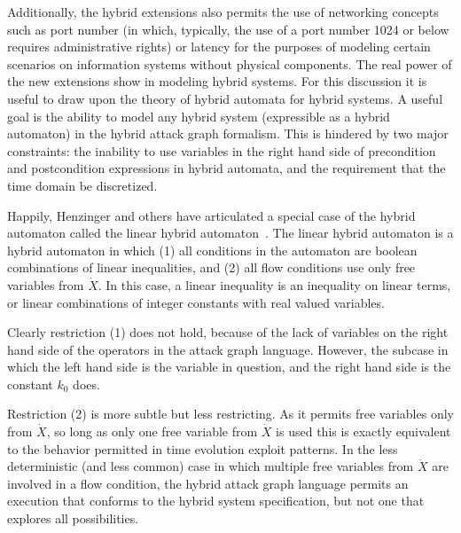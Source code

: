 Additionally, the hybrid extensions also permits the use of
networking concepts such as port number (in which, typically, the use of a
port number 1024 or below requires administrative rights) or latency for the
purposes of modeling certain scenarios on information systems without physical
components.
The real power of the new extensions show in modeling hybrid systems. For
this discussion it is useful to draw upon the theory of hybrid automata for
hybrid systems. A useful goal is the ability to model any hybrid system
(expressible as a hybrid automaton) in the hybrid attack graph formalism. This
is hindered by two major constraints: the inability to use variables
in the right hand side of precondition and postcondition expressions in
hybrid automata, and the requirement that the time domain be discretized.

\label{sec:hag_ha}
Happily, Henzinger and others have articulated a special case of the
hybrid automaton called the linear hybrid automaton~\cite{henzinger1996theory}.
The linear hybrid automaton is a hybrid automaton in which (1) all conditions
in the automaton are boolean combinations of linear inequalities, and (2) all
flow conditions use only free variables from $\dot{X}$. In this case, a linear
inequality is an inequality on linear terms, or linear combinations of
integer constants with real valued variables.

Clearly restriction (1) does not hold, because of the lack of variables
on the right hand side of the operators in the attack graph language. However,
the subcase in which the left hand side is the variable in question, and the
right hand side is the constant $k_0$ does.

Restriction (2) is more subtle but less restricting. As it permits free
variables only from $\dot{X}$, so long as only one free variable from $\dot{X}$ is
used this is exactly equivalent to the behavior permitted in time evolution
exploit patterns. In the less deterministic (and less common) case in which
multiple free variables from $\dot{X}$ are involved in a flow condition,
the hybrid attack graph language permits an execution that conforms to the
hybrid system specification, but not one that explores all possibilities.

